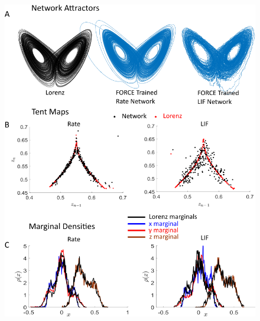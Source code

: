 \documentclass[11pt]{article} %
\begin{document}
\begin{figure}[htp!]
\centering
  \includegraphics[scale=0.78]{FFIGS9}

\end{figure}
\end{document}
